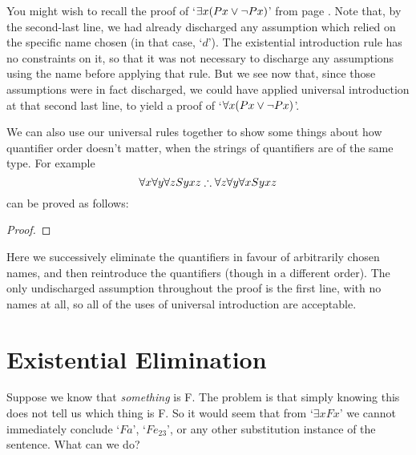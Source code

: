 You might wish to recall the proof of `$\exists x (Px \vee \neg Px)$' from page \pageref{exexmid}. Note that, by the second-last line, we had already discharged any assumption which relied on the specific name chosen (in that case, `$d$'). The existential introduction rule has no constraints on it, so that it was not necessary to discharge any assumptions using the name before applying that rule. But we see now that, since those assumptions were in fact discharged, we could have applied universal introduction at that second last line, to yield a proof of `$\forall x (Px \vee \neg Px)$'.

We can also use our universal rules together to show some things about how quantifier order doesn't matter, when the strings of quantifiers are of the same type. For example $$\forall x \forall y \forall z Syxz \mathrel{\therefore} \forall z \forall y \forall x Syxz$$ can be proved as follows: \begin{proof}
\end{proof} Here we successively eliminate the quantifiers in favour of arbitrarily chosen names, and then reintroduce the quantifiers (though in a different order). The only undischarged assumption throughout the proof is the first line, with no names at all, so all of the uses of universal introduction are acceptable.


\section{Existential Elimination}\label{exelim}
Suppose we know that \emph{something} is F. The problem is that simply knowing this does not tell us which thing is F. So it would seem that from `$\exists x Fx$' we cannot immediately conclude `$Fa$', `$Fe_{23}$', or any other substitution instance of the sentence. What can we do?

